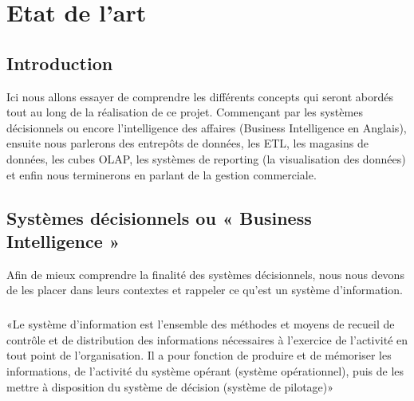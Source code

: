 \chapter{Etat de l'art}

\section*{Introduction}%
%
Ici nous allons essayer de comprendre les différents concepts qui seront abordés tout au long de la réalisation de ce projet. Commençant par les systèmes décisionnels ou encore l’intelligence des affaires (Business Intelligence en Anglais), ensuite nous parlerons des entrepôts de données, les ETL, les magasins de données, les cubes OLAP, les systèmes de reporting (la visualisation des données) et enfin nous terminerons en parlant de la gestion commerciale.


\section{Systèmes décisionnels ou « Business Intelligence »}
Afin de mieux comprendre la finalité des systèmes décisionnels, nous nous devons de les placer dans leurs contextes et rappeler ce qu’est un système d’information.

\paragraph{}
«Le système d’information est l’ensemble des méthodes et moyens de recueil de contrôle et de distribution des informations nécessaires à l’exercice de l’activité en tout point de l’organisation. Il a pour fonction de produire et de mémoriser les informations, de l’activité du système opérant (système opérationnel), puis de les mettre à disposition du système de décision (système de pilotage)» \cite{book:3}
